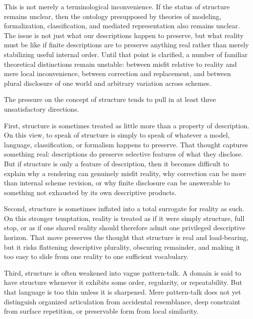 \documentclass[11pt]{article}
\begin{document}
This is not merely a terminological inconvenience. If the status of structure remains unclear, then the ontology presupposed by theories of modeling, formalization, classification, and mediated representation also remains unclear. The issue is not just what our descriptions happen to preserve, but what reality must be like if finite descriptions are to preserve anything real rather than merely stabilizing useful internal order. Until that point is clarified, a number of familiar theoretical distinctions remain unstable: between misfit relative to reality and mere local inconvenience, between correction and replacement, and between plural disclosure of one world and arbitrary variation across schemes.

The pressure on the concept of structure tends to pull in at least three unsatisfactory directions.

First, structure is sometimes treated as little more than a property of description. On this view, to speak of structure is simply to speak of whatever a model, language, classification, or formalism happens to preserve. That thought captures something real: descriptions do preserve selective features of what they disclose. But if structure is only a feature of description, then it becomes difficult to explain why a rendering can genuinely misfit reality, why correction can be more than internal scheme revision, or why finite disclosure can be answerable to something not exhausted by its own descriptive products. \cite{Chakravartty2011ScientificRealismSEP,FriggNguyen2021ScientificRepresentationSEP}

Second, structure is sometimes inflated into a total surrogate for reality as such. On this stronger temptation, reality is treated as if it were simply structure, full stop, or as if one shared reality should therefore admit one privileged descriptive horizon. That move preserves the thought that structure is real and load-bearing, but it risks flattening descriptive plurality, obscuring remainder, and making it too easy to slide from one reality to one sufficient vocabulary. \cite{Ladyman1998WhatIsStructuralRealism,Giere2006ScientificPerspectivism,Massimi2022PerspectivalRealism}

Third, structure is often weakened into vague pattern-talk. A domain is said to have structure whenever it exhibits some order, regularity, or repeatability. But that language is too thin unless it is sharpened. Mere pattern-talk does not yet distinguish organized articulation from accidental resemblance, deep constraint from surface repetition, or preservable form from local similarity.
\end{document}
